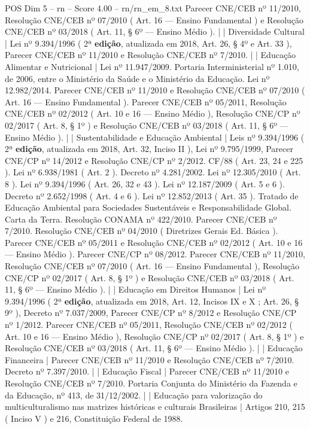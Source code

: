 \begin{textsample}{POS Dim 5 – rn – Score 4.00 – rn/rn\_em\_8.txt}
Parecer CNE/CEB nº 11/2010, Resolução CNE/CEB nº 07/2010 ( Art. 16 — Ensino Fundamental ) e Resolução CNE/CEB nº 03/2018 ( Art. 11, § 6º — Ensino Médio ). | | Diversidade Cultural | Lei nº 9.394/1996 ( 2ª \textbf{edição}, atualizada em 2018, Art. 26, § 4º e Art. 33 ), Parecer CNE/CEB nº 11/2010 e Resolução CNE/CEB nº 7/2010. | | Educação Alimentar e Nutricional | Lei nº 11.947/2009.
Portaria Interministerial nº 1.010, de 2006, entre o Ministério da Saúde e o Ministério da Educação.
Lei nº 12.982/2014.
Parecer CNE/CEB nº 11/2010 e Resolução CNE/CEB nº 07/2010 ( Art. 16 — Ensino Fundamental ).
Parecer CNE/CEB nº 05/2011, Resolução CNE/CEB nº 02/2012 ( Art. 10 e 16 — Ensino Médio ), Resolução CNE/CP nº 02/2017 ( Art. 8, § 1º ) e Resolução CNE/CEB nº 03/2018 ( Art. 11, § 6º — Ensino Médio ). | | Sustentabilidade e Educação Ambiental | Leis nº 9.394/1996 ( 2ª \textbf{edição}, atualizada em 2018, Art. 32, Inciso II ), Lei nº 9.795/1999, Parecer CNE/CP nº 14/2012 e Resolução CNE/CP nº 2/2012.
CF/88 ( Art. 23, 24 e 225 ).
Lei nº 6.938/1981 ( Art. 2 ).
Decreto nº 4.281/2002.
Lei nº 12.305/2010 ( Art. 8 ).
Lei nº 9.394/1996 ( Art. 26, 32 e 43 ).
Lei nº 12.187/2009 ( Art. 5 e 6 ).
Decreto nº 2.652/1998 ( Art. 4 e 6 ).
Lei nº 12.852/2013 ( Art. 35 ).
Tratado de Educação Ambiental para Sociedades Sustentáveis e Responsabilidade Global.
Carta da Terra.
Resolução CONAMA nº 422/2010.
Parecer CNE/CEB nº 7/2010.
Resolução CNE/CEB nº 04/2010 ( Diretrizes Gerais Ed.
Básica ).
Parecer CNE/CEB nº 05/2011 e Resolução CNE/CEB nº 02/2012 ( Art. 10 e 16 — Ensino Médio ).
Parecer CNE/CP nº 08/2012.
Parecer CNE/CEB nº 11/2010, Resolução CNE/CEB nº 07/2010 ( Art. 16 — Ensino Fundamental ), Resolução CNE/CP nº 02/2017 ( Art. 8, § 1º ) e Resolução CNE/CEB nº 03/2018 ( Art. 11, § 6º — Ensino Médio ). | | Educação em Direitos Humanos | Lei nº 9.394/1996 ( 2ª \textbf{edição}, atualizada em 2018, Art. 12, Incisos IX e X ; Art. 26, § 9º ), Decreto nº 7.037/2009, Parecer CNE/CP nº 8/2012 e Resolução CNE/CP nº 1/2012.
Parecer CNE/CEB nº 05/2011, Resolução CNE/CEB nº 02/2012 ( Art. 10 e 16 — Ensino Médio ), Resolução CNE/CP nº 02/2017 ( Art. 8, § 1º ) e Resolução CNE/CEB nº 03/2018 ( Art. 11, § 6º — Ensino Médio ). | | Educação Financeira | Parecer CNE/CEB nº 11/2010 e Resolução CNE/CEB nº 7/2010.
Decreto nº 7.397/2010. | | Educação Fiscal | Parecer CNE/CEB nº 11/2010 e Resolução CNE/CEB nº 7/2010.
Portaria Conjunta do Ministério da Fazenda e da Educação, nº 413, de 31/12/2002. | | Educação para valorização do multiculturalismo nas matrizes históricas e culturais Brasileiras | Artigos 210, 215 ( Inciso V ) e 216, Constituição Federal de 1988.

\end{textsample}
